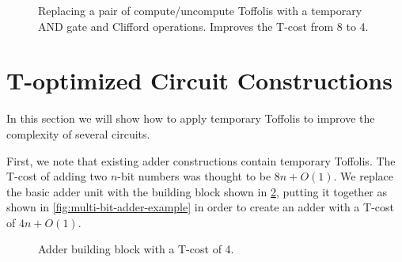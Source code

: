 \documentclass[twocolumn,longbibliography]{quantumarticle-customized}
\begin{document}
\begin{figure}
  \caption{
	Replacing a pair of compute/uncompute Toffolis with a temporary AND gate and Clifford operations.
	Improves the T-cost from 8 to 4.
  }
  \label{fig:paired-toffoli-to-logical-and}
\end{figure}


\section{T-optimized Circuit Constructions}
\label{sec:circuit-constructions}

In this section we will show how to apply temporary Toffolis to improve the complexity of several circuits.

First, we note that existing adder constructions contain temporary Toffolis.
The T-cost of adding two $n$-bit numbers was thought to be $8n + O(1)$.
We replace the basic adder unit with the building block shown in \ref{fig:full-adder-block}, putting it together as shown in \ref{fig:multi-bit-adder-example} in order to create an adder with a T-cost of $4n + O(1)$.

\begin{figure}
  \caption{
	Adder building block with a T-cost of 4.
  }
  \label{fig:full-adder-block}
\end{figure}
\end{document}
